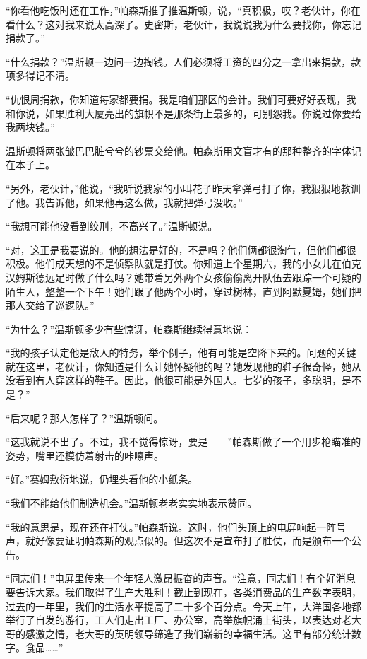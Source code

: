 ``你看他吃饭时还在工作，''帕森斯推了推温斯顿，说，``真积极，哎？老伙计，你在看什么？这对我来说太高深了。史密斯，老伙计，我说说我为什么要找你，你忘记捐款了。''

``什么捐款？''温斯顿一边问一边掏钱。人们必须将工资的四分之一拿出来捐款，款项多得记不清。

``仇恨周捐款，你知道每家都要捐。我是咱们那区的会计。我们可要好好表现，我和你说，如果胜利大厦亮出的旗帜不是那条街上最多的，可别怨我。你说过你要给我两块钱。''

温斯顿将两张皱巴巴脏兮兮的钞票交给他。帕森斯用文盲才有的那种整齐的字体记在本子上。

``另外，老伙计，''他说，``我听说我家的小叫花子昨天拿弹弓打了你，我狠狠地教训了他。我告诉他，如果他再这么做，我就把弹弓没收。''

``我想可能他没看到绞刑，不高兴了。''温斯顿说。

``对，这正是我要说的。他的想法是好的，不是吗？他们俩都很淘气，但他们都很积极。他们成天想的不是侦察队就是打仗。你知道上个星期六，我的小女儿在伯克汉姆斯德远足时做了什么吗？她带着另外两个女孩偷偷离开队伍去跟踪一个可疑的陌生人，整整一个下午！她们跟了他两个小时，穿过树林，直到阿默夏姆，她们把那人交给了巡逻队。''

``为什么？''温斯顿多少有些惊讶，帕森斯继续得意地说：

``我的孩子认定他是敌人的特务，举个例子，他有可能是空降下来的。问题的关键就在这里，老伙计，你知道是什么让她怀疑他的吗？她发现他的鞋子很奇怪，她从没看到有人穿这样的鞋子。因此，他很可能是外国人。七岁的孩子，多聪明，是不是？''

``后来呢？那人怎样了？''温斯顿问。

``这我就说不出了。不过，我不觉得惊讶，要是——''帕森斯做了一个用步枪瞄准的姿势，嘴里还模仿着射击的咔嚓声。

``好。''赛姆敷衍地说，仍埋头看他的小纸条。

``我们不能给他们制造机会。''温斯顿老老实实地表示赞同。

``我的意思是，现在还在打仗。''帕森斯说。这时，他们头顶上的电屏响起一阵号声，就好像要证明帕森斯的观点似的。但这次不是宣布打了胜仗，而是颁布一个公告。

``同志们！''电屏里传来一个年轻人激昂振奋的声音。``注意，同志们！有个好消息要告诉大家。我们取得了生产大胜利！截止到现在，各类消费品的生产数字表明，过去的一年里，我们的生活水平提高了二十多个百分点。今天上午，大洋国各地都举行了自发的游行，工人们走出工厂、办公室，高举旗帜涌上街头，以表达对老大哥的感激之情，老大哥的英明领导缔造了我们崭新的幸福生活。这里有部分统计数字。食品\ldots\ldots''

